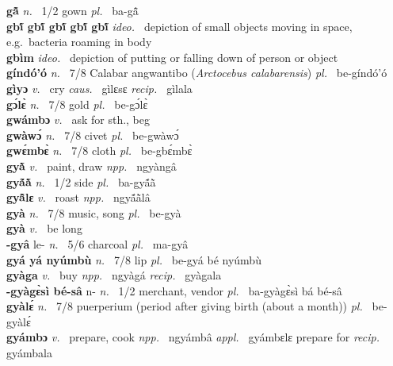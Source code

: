 \noindent
{\bfseries gã̂}  {\itshape n.~} 1/2 gown {\itshape pl.~} ba-gã̂    \\ 
{\bfseries gbĩ́ gbĩ́ gbĩ́ gbĩ́ gbĩ́}  {\itshape ideo.~} depiction of small objects moving in space, e.g.\ bacteria roaming in body    \\ 
{\bfseries gbìm}  {\itshape ideo.~} depiction of putting or falling down of person or object    \\ 
{\bfseries gíndó'ó} {\itshape n.~} 7/8 Calabar angwantibo ({\itshape Arctocebus calabarensis}) {\itshape pl.~} be-gíndó'ó    \\ 
{\bfseries gìyɔ}  {\itshape v.~} cry   {\itshape caus.~} gìlɛsɛ {\itshape recip.~} gìlala  \\ 
{\bfseries gɔ́lɛ̀}  {\itshape n.~} 7/8 gold {\itshape pl.~} be-gɔ́lɛ̀    \\ 
{\bfseries gwámbɔ}  {\itshape v.~} ask for sth., beg    \\ 
{\bfseries gwàwɔ́}  {\itshape n.~} 7/8 civet {\itshape pl.~} be-gwàwɔ́    \\ 
{\bfseries gwɛ́mbɛ̀}  {\itshape n.~} 7/8 cloth {\itshape pl.~} be-gbɛ́mbɛ̀    \\ 
{\bfseries gyã̀}  {\itshape v.~} paint, draw   {\itshape npp.~} ngyàngâ  \\ 
{\bfseries gyã́ã̀}  {\itshape n.~} 1/2 side {\itshape pl.~} ba-gyã́ã̀    \\ 
{\bfseries gyã̂lɛ}  {\itshape v.~} roast   {\itshape npp.~} ngyã́ã̀lâ  \\ 
{\bfseries gyà}  {\itshape n.~} 7/8 music, song {\itshape pl.~} be-gyà    \\ 
{\bfseries gyà}  {\itshape v.~} be long    \\ 
{\bfseries -gyâ} le- {\itshape n.~} 5/6 charcoal {\itshape pl.~} ma-gyâ    \\ 
{\bfseries gyá yá nyúmbù}  {\itshape n.~} 7/8 lip {\itshape pl.~} be-gyá bé nyúmbù    \\ 
{\bfseries gyàga}  {\itshape v.~} buy   {\itshape npp.~} ngyàgá {\itshape recip.~} gyàgala  \\ 
{\bfseries -gyàgɛ̀sì bé-sâ} n- {\itshape n.~} 1/2 merchant, vendor {\itshape pl.~} ba-gyàgɛ̀sì bá bé-sâ    \\ 
{\bfseries gyàlɛ́}  {\itshape n.~} 7/8 puerperium (period after giving birth (about a month)) {\itshape pl.~} be-gyàlɛ́    \\ 
{\bfseries gyámbɔ}  {\itshape v.~} prepare, cook   {\itshape npp.~} ngyámbâ {\itshape appl.~} gyámbɛlɛ prepare for {\itshape recip.~} gyámbala  \\ 
